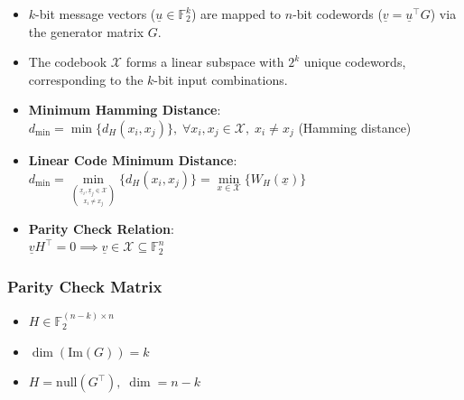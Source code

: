 \documentclass[11pt]{article}
\providecommand{\tightlist}{%
      \setlength{\itemsep}{0pt}\setlength{\parskip}{0pt}}
\begin{document}
\begin{itemize}
\item
  \(k\)-bit message vectors (\(\underline{u} \in \mathbb{F}_2^k\)) are
  mapped to \(n\)-bit codewords
  (\(\underline{v} = \underline{u}^\top G\)) via the generator matrix
  \(G\).
\item
  The codebook \(\mathcal{X}\) forms a linear subspace with \(2^k\)
  unique codewords, corresponding to the \(k\)-bit input combinations.
\item
  \textbf{Minimum Hamming Distance}:\\
  \(d_\text{min} = \min \{ d_H(x_i, x_j) \}, \; \forall x_i, x_j \in \mathcal{X}, \; x_i \neq x_j\)
  (Hamming distance)
\item
  \textbf{Linear Code Minimum Distance}:\\
  \(d_\text{min} = \min\limits_{\binom{\underline{x}_i, \underline{x}_j \in \mathcal{X}}{x_i \neq x_j}} \big\{ d_H(x_i, x_j) \big\} = \min\limits_{x \in \mathcal{X}} \big\{ W_H(\underline{x}) \big\}\)
\item
  \textbf{Parity Check Relation}:\\
  \(\underline{v} H^\top = 0 \implies \underline{v} \in \mathcal{X} \subseteq \mathbb{F}_2^n\)
\end{itemize}

\subsubsection{Parity Check Matrix}\label{parity-check-matrix}

\begin{itemize}
\tightlist
\item
  \(H \in \mathbb{F}_2^{(n-k) \times n}\)
\item
  \(\dim(\text{Im}(G)) = k\)
\item
  \(H = \text{null}(G^\top), \; \dim = n - k\)
\end{itemize}
\end{document}
